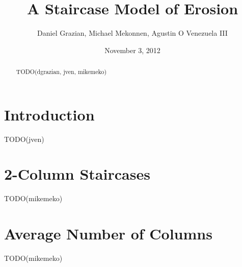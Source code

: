\documentclass[12pt]{amsart}
\title{A Staircase Model of Erosion}
\author{Daniel Grazian, Michael Mekonnen, Agustin O Venezuela III}
\date{November 3, 2012}
\begin{document}
\begin{abstract}
TODO(dgrazian, jven, mikemeko)
\end{abstract}

\maketitle

\section{Introduction\label{sec:intro}}
TODO(jven)

\section{2-Column Staircases\label{sec:2column}}
TODO(mikemeko)

\section{Average Number of Columns\label{sec:columns}}
TODO(mikemeko)
\end{document}
